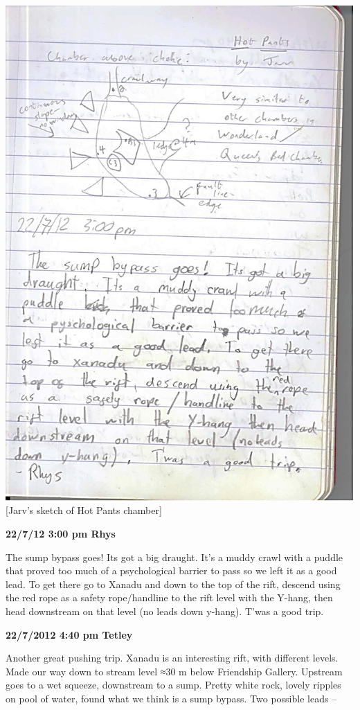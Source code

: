\includegraphics{UgLog1012/70.jpeg}\\
{[}Jarv's sketch of Hot Pants chamber{]}

\textbf{22/7/12 3:00 pm Rhys}

The sump bypass goes! Its got a big draught. It's a muddy crawl with a
puddle that proved too much of a psychological barrier to pass so we
left it as a good lead. To get there go to Xanadu and down to the top of
the rift, descend using the red rope as a safety rope/handline to the
rift level with the Y-hang, then head downstream on that level (no leads
down y-hang). T'was a good trip.

\textbf{22/7/2012 4:40 pm Tetley}

Another great pushing trip. Xanadu is an interesting rift, with
different levels. Made our way down to stream level ≈30 m below
Friendship Gallery. Upstream goes to a wet squeeze, downstream to a
sump. Pretty white rock, lovely ripples on pool of water, found what we
think is a sump bypass. Two possible leads --

